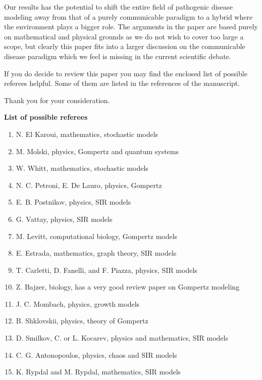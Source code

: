 \documentclass[11pt,a4paper,roman]{moderncv}
\begin{document}
Our results has the potential to shift the entire field of pathogenic disease modeling away from that of a purely communicable paradigm to a hybrid where the environment plays a bigger role. 
The arguments in the paper are based purely on mathematical and physical grounds as we do not wish to cover too large a scope, but clearly this paper fits into a larger discussion on the communicable disease paradigm which we feel is missing in the current scientific debate.

If you do decide to review this paper you may find the enclosed list of possible referees helpful. 
Some of them are listed in the references of the manuscript.

Thank you for your consideration.


\makeletterclosing
\newpage
\textbf{List of possible referees}
\begin{enumerate}
\item N. El Karoui, mathematics, stochastic models
\item M. Molski, physics, Gompertz and quantum systems
\item W. Whitt, mathematics, stochastic models
\item N. C. Petroni, E. De Lauro, physics, Gompertz
\item E. B. Postnikov, physics, SIR models
\item G. Vattay, physics, SIR models
\item M. Levitt, computational biology, Gompertz models
\item E. Estrada, mathematics, graph theory, SIR models
\item T. Carletti, D. Fanelli, and F. Piazza, physics, SIR models
\item Z. Bajzer, biology, has a very good review paper on Gompertz modeling 
\item J. C. Mombach, physics, growth models
\item B. Shklovskii, physics, theory of Gompertz
\item D. Smilkov, C. or L. Kocarev, physics and mathematics, SIR models
\item C. G. Antonopoulos, physics, chaos and SIR models
\item K. Rypdal and M. Rypdal, mathematics, SIR models

\end{enumerate} 
\end{document}
